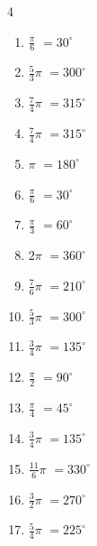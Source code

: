 \begin{multicols}{4}
\begin{enumerate}
  \item $\displaystyle \frac{\pi}{6}$
        $\displaystyle =30^{\circ}$

  \item $\displaystyle \frac{5}{3}\pi$
        $\displaystyle =300^{\circ}$

  \item $\displaystyle \frac{7}{4}\pi$
        $\displaystyle =315^{\circ}$

  \item $\displaystyle \frac{7}{4}\pi$
        $\displaystyle =315^{\circ}$

  \item $\displaystyle \pi$
        $\displaystyle =180^{\circ}$

  \item $\displaystyle \frac{\pi}{6}$
        $\displaystyle =30^{\circ}$

  \item $\displaystyle \frac{\pi}{3}$
        $\displaystyle =60^{\circ}$

\columnbreak %

  \item $\displaystyle 2\pi$
        $\displaystyle =360^{\circ}$

  \item $\displaystyle \frac{7}{6}\pi$
        $\displaystyle =210^{\circ}$

  \item $\displaystyle \frac{5}{3}\pi$
        $\displaystyle =300^{\circ}$

  \item $\displaystyle \frac{3}{4}\pi$
        $\displaystyle =135^{\circ}$

  \item $\displaystyle \frac{\pi}{2}$
        $\displaystyle =90^{\circ}$

  \item $\displaystyle \frac{\pi}{4}$
        $\displaystyle =45^{\circ}$

  \item $\displaystyle \frac{3}{4}\pi$
        $\displaystyle =135^{\circ}$

  \item $\displaystyle \frac{11}{6}\pi$
        $\displaystyle =330^{\circ}$

  \item $\displaystyle \frac{3}{2}\pi$
        $\displaystyle =270^{\circ}$

  \item $\displaystyle \frac{5}{4}\pi$
        $\displaystyle =225^{\circ}$


\end{enumerate}
\end{multicols}

